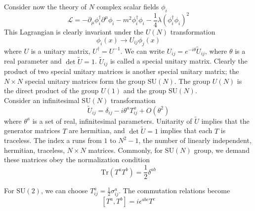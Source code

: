 \noindent
Consider now the theory of $N$ complex scalar fields $\phi_i$
\[\mathcal{L} = -\partial_{\mu}\phi^{\dagger}_i \partial^{\mu}\phi_i - m^2\phi_i^{\dagger}\phi_i - \frac{1}{4}\lambda(\phi_i^{\dagger}\phi_i)^2\]
This Lagrangian is clearly invariant under the $U(N)$ transformation
\[\phi_i(x) \to U_{ij}\phi_j(x)\]
where $U$ is a unitary matrix, $U^{\dagger} = U^{-1}$. We can write $U_{ij} = e^{-i\theta} \widetilde{U}_{ij}$, where $\theta$ is a real parameter and $\det \widetilde{U} = 1$.
$\widetilde{U}_{ij}$ is called a special unitary matrix.
Clearly the product of two special unitary matrices is another special unitary matrix; the $N \times N$ special unitary matrices form the group $\mathrm{SU}(N)$. 
The group $U(N)$ is the direct product of the group $U(1)$ and the group $\mathrm{SU}(N)$.\\
Consider an infinitesimal $\mathrm{SU}(N)$ transformation
\[\widetilde{U}_{ij} = \delta_{ij} - i\theta^aT^a_{ij} + O(\theta^2)\]
where $\theta^a$ is a set of real, infinitesimal parameters. Unitarity of $\widetilde{U}$ implies that the generator matrices $T$ are hermitian, and $\det \widetilde{U} = 1$ implies that each $T$ is traceless.
The index a runs from $1$ to $N^2 - 1$, the number of linearly independent, hermitian, traceless, $N \times N$ matrices. Commonly, for $\mathrm{SU}(N)$ group, we demand these matrices obey the normalization condition
\[\mathrm{Tr}(T^a T^b) =\frac{1}{2}\delta^{ab}\]

\begin{example}
For $\mathrm{SU}(2)$, we can choose $T^a_{ij} = \frac{1}{2}\sigma^a_{ij}$. The commutation relations become
\[[T^a,T^b] = i\epsilon^{abc}T^c\]
\end{example}

